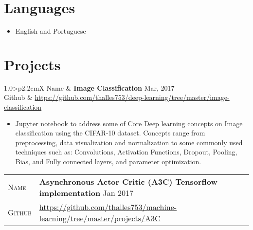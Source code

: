 \documentclass[10pt, a4paper, oneside, final]{scrartcl} %
\newcommand{\gray}{\rowcolor[gray]{.90}} %
\begin{document}

\section{Languages}

\begin{itemize} \itemsep1.5pt \parskip0pt 
  \item English and Portuguese 
\end{itemize}



\section{Projects}

\begin{center}
\begin{tabularx}{1.0\linewidth}{>{\raggedleft\scshape}p{2.2cm}X}
\gray Name & \textbf{Image Classification} \hfill Mar, 2017\\
\gray Github & \url{https://github.com/thalles753/deep-learning/tree/master/image-classification} \\
\end{tabularx}
\end{center}

\begin{itemize}\itemsep1.5pt
\item Jupyter notebook to address some of Core Deep learning concepts on Image classification using the CIFAR-10 dataset. Concepts range from preprocessing, data visualization and normalization to some commonly used techniques such as: Convolutions, Activation Functions, Dropout, Pooling, Bias, and Fully connected layers, and parameter optimization.
\end{itemize}

\begin{center}
\begin{tabularx}{1.0\linewidth}{>{\raggedleft\scshape}p{2.2cm}X}
\gray Name & \textbf{Asynchronous Actor Critic (A3C) Tensorflow implementation} \hfill Jan 2017\\
\gray Github & \url{https://github.com/thalles753/machine-learning/tree/master/projects/A3C}\\
\end{tabularx}
\end{center}
\end{document}
